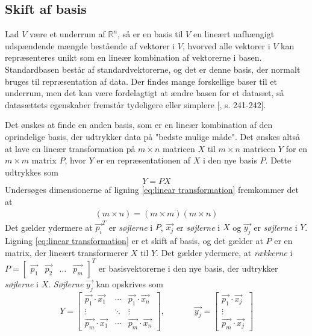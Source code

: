 \subsection*{Skift af basis}
Lad $V$ være et underrum af $\mathbb{R}^n$, så er en basis til $V$ en lineært uafhængigt udspændende mængde bestående af vektorer i $V$, hvorved alle vektorer i $V$ kan repræsenteres unikt som en lineær kombination af vektorerne i basen. \\
Standardbasen består af standardvektorerne, og det er denne basis, der normalt bruges til repræsentation af data. Der findes mange forskellige baser til et underrum, men det kan være fordelagtigt at ændre basen for et datasæt, så datasættets egenskaber fremstår tydeligere eller simplere [\citet{linalg}, s. 241-242].

Det ønskes at finde en anden basis, som er en lineær kombination af den oprindelige basis, der udtrykker data på "bedste mulige måde". Det ønskes altså at lave en lineær transformation på $m \times n$ matricen $X$ til $m \times n$ matricen $Y$ for en $m \times m$ matrix $P$, hvor $Y$ er en repræsentationen af $X$ i den nye basis $P$. Dette udtrykkes som
\begin{equation}
Y=PX
\label{eq:linear transformation}
\end{equation}
Undersøges dimensionerne af ligning \vref{eq:linear transformation} fremkommer det at
\begin{align}
(m \times n) = (m \times m)(m \times n)
\end{align}
Det gælder ydermere at ${\vec{p_{i}}}^T$ er \emph{søjlerne} i $P$, $\vec{x_{j}}$ er \emph{søjlerne} i $X$ og $\vec{y_{j}}$ er \emph{søjlerne} i $Y$. Ligning \ref{eq:linear transformation} er et skift af basis, og det gælder at $P$ er en matrix, der lineært transformerer $X$ til $Y$. Det gælder ydermere, at \emph{rækkerne} i $P = \begin{bmatrix} \vec{p_{1}} & \vec{p_{2}} & \hdots & \vec{p_{m}} \end{bmatrix}^T$ er basisvektorerne i den nye basis, der udtrykker \emph{søjlerne} i $X$.
\emph{Søjlerne} $\vec{y_{j}}$ kan opskrives som
$$ Y = \begin{bmatrix}
\vec{p_1} \cdot \vec{x_1}	& \cdots		&	\vec{p_1} \cdot \vec{x_n}	\\ 
\vdots			& \ddots		&	\vdots			\\ 
\vec{p_m} \cdot \vec{x_1}	& \cdots		&	\vec{p_m} \cdot \vec{x_n}
\end{bmatrix} , \phantom{mmmm} \vec{y_{j}}=\begin{bmatrix} \vec{p_1} \cdot \vec{x_j} \\ \vdots \\ \vec{p_m} \cdot \vec{x_j} \end{bmatrix}$$

